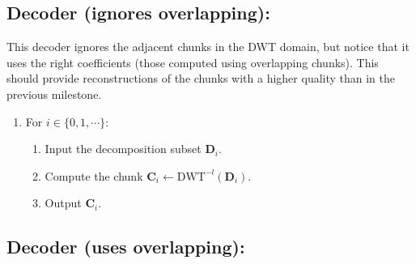 
\subsection*{Decoder (ignores overlapping):}
This decoder ignores the adjacent chunks in the DWT domain, but notice that it uses the right coefficients (those computed using overlapping chunks). This should provide reconstructions of the chunks with a higher quality than in the previous milestone.
\begin{enumerate}
\item For $i\in\{0,1,\cdots\}$:
  \begin{enumerate}
  \item Input the decomposition subset ${\mathbf D}_i$.
  \item Compute the chunk ${\mathbf C}_i\leftarrow\text{DWT}^{-l}({\mathbf D}_i)$.
  \item Output ${\mathbf C}_i$.
  \end{enumerate}
\end{enumerate}

\subsection*{Decoder (uses overlapping):}

